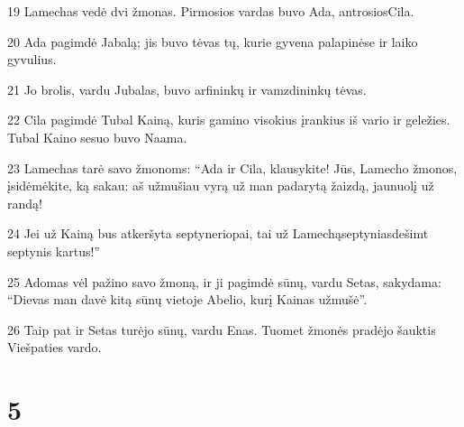 \par 19 Lamechas vedė dvi žmonas. Pirmosios vardas buvo Ada, antrosios­Cila. 
\par 20 Ada pagimdė Jabalą; jis buvo tėvas tų, kurie gyvena palapinėse ir laiko gyvulius. 
\par 21 Jo brolis, vardu Jubalas, buvo arfininkų ir vamzdininkų tėvas. 
\par 22 Cila pagimdė Tubal Kainą, kuris gamino visokius įrankius iš vario ir geležies. Tubal Kaino sesuo buvo Naama. 
\par 23 Lamechas tarė savo žmonoms: “Ada ir Cila, klausykite! Jūs, Lamecho žmonos, įsidėmėkite, ką sakau: aš užmušiau vyrą už man padarytą žaizdą, jaunuolį už randą! 
\par 24 Jei už Kainą bus atkeršyta septyneriopai, tai už Lamechą­septyniasdešimt septynis kartus!” 
\par 25 Adomas vėl pažino savo žmoną, ir ji pagimdė sūnų, vardu Setas, sakydama: “Dievas man davė kitą sūnų vietoje Abelio, kurį Kainas užmušė”. 
\par 26 Taip pat ir Setas turėjo sūnų, vardu Enas. Tuomet žmonės pradėjo šauktis Viešpaties vardo.



\chapter{5}

